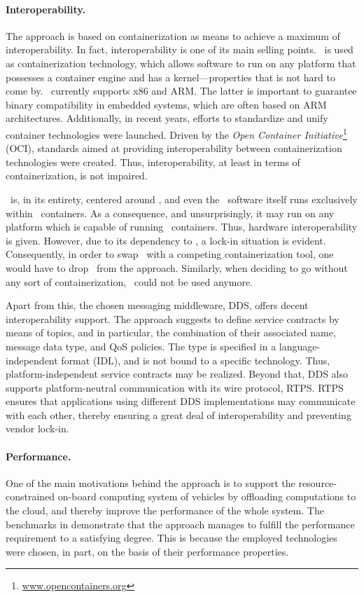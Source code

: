 \paragraph{Interoperability.}
The approach is based on containerization as means to achieve a maximum of interoperability. In fact, interoperability is one of its main selling points. \docker\ is used as containerization technology, which allows software to run on any platform that possesses a container engine and has a kernel---properties that is not hard to come by. \docker\ currently supports x86 and ARM. The latter is important to guarantee binary compatibility in embedded systems, which are often based on ARM architectures. Additionally, in recent years, efforts to standardize and unify container technologies were launched. Driven by the \emph{Open Container Initiative}\footnote{\url{www.opencontainers.org}} (OCI), standards aimed at providing interoperability between containerization technologies were created. Thus, interoperability, at least in terms of containerization, is not impaired.

\weave\ is, in its entirety, centered around \docker , and even the \weave\ software itself runs exclusively within \docker\ containers. As a consequence, and unsurprisingly, it may run on any platform which is capable of running \docker\ containers. Thus, hardware interoperability is given. However, due to its dependency to \docker , a lock-in situation is evident. Consequently, in order to swap \docker\ with a competing containerization tool, one would have to drop \wnet\ from the approach. Similarly, when deciding to go without any sort of containerization, \weave\ could not be used anymore.

Apart from this, the chosen messaging middleware, DDS, offers decent interoperability support. The approach suggests to define service contracts by means of topics, and in particular, the combination of their associated name, message data type, and QoS policies. The type is specified in a language-independent format (IDL), and is not bound to a specific technology. Thus, platform-independent service contracts may be realized. Beyond that, DDS also supports platform-neutral communication with its wire protocol, RTPS. RTPS ensures that applications using different DDS implementations may communicate with each other, thereby ensuring a great deal of interoperability and preventing vendor lock-in.

\paragraph{Performance.}
One of the main motivations behind the approach is to support the resource-constrained on-board computing system of vehicles by offloading computations to the cloud, and thereby improve the performance of the whole system. The benchmarks in  demonstrate that the approach manages to fulfill the performance requirement to a satisfying degree. This is because the employed technologies were chosen, in part, on the basis of their performance properties.

